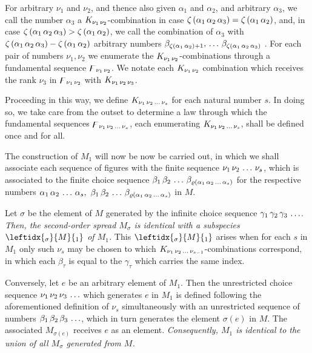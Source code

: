 \documentclass{amsart}
\newcommand\Rank[1]{\varrho\left(#1\right)}
\newcommand\Max[1]{\zeta\left(#1\right)}
\begin{document}
For arbitrary $\nu_1$ and $\nu_2$, and thence also given $\alpha_1$ and
$\alpha_2$, and arbitrary $\alpha_3$, we call the number $\alpha_3$ a
$K_{\Sequence{\nu_1,\nu_2}}$-combination in case $\Max{\Sequence{\alpha_1,\alpha_2,\alpha_3}} =
\Max{\Sequence{\alpha_1,\alpha_2}}$, and, in case $\Max{\Sequence{\alpha_1,\alpha_2,\alpha_3}} >
\Max{\Sequence{\alpha_1,\alpha_2}}$, we  call the combination of
$\alpha_3$ with $\Max{\Sequence{\alpha_1,\alpha_2,\alpha_3}} - \Max{\Sequence{\alpha_1,\alpha_2}}$
arbitrary numbers $\beta_{\Max{\Sequence{\alpha_1,\alpha_2}} +
1},\,\dots\,\beta_{\Max{\Sequence{\alpha_1,\alpha_2,\alpha_3}}}$ . For each pair of numbers $\nu_1,
\nu_2$ we enumerate the $K_{\Sequence{\nu_1,\nu_2}}$-combinations through a
fundamental sequence $\digamma_{\Sequence{\nu_1,\nu_2}}$. We notate each
$K_{\Sequence{\nu_1,\nu_2}}$ combination which receives the rank $\nu_3$ in
$\digamma_{\Sequence{\nu_1,\nu_2}}$ with $K_{\Sequence{\nu_1,\nu_2,\nu_3}}$.

Proceeding in this way, we define $K_{\Sequence{\nu_1,\nu_2,\dots,\nu_s}}$ for each natural
number $s$. In doing so, we take care from the outset to determine a
law through which the fundamental sequences $\digamma_{\Sequence{\nu_1,\nu_2,\dots,\nu_s}}$,
each enumerating $K_{\Sequence{\nu_1,\nu_2,\dots,\nu_s}}$, shall be defined once and for all.

The construction of $M_1$ will now be now be carried out, in which we shall
associate each sequence of figures with the finite sequence
$\Sequence{\nu_1,\nu_2,\dots,\nu_s}$, which is associated to the finite choice sequence
$\Sequence{\beta_1,\beta_2,\dots,\beta_{\Rank{\Sequence{\alpha_1,\alpha_2,\dots,\alpha_s}}}}$
for the respective numbers $\Sequence{\alpha_1,\alpha_2,\dots,\alpha_s},\
\Sequence{\beta_1,\beta_2,\dots,\beta_{\Rank{\Sequence{\alpha_1,\alpha_2,\dots,\alpha_s}}}}$
in $M$.

\bigskip

Let $\sigma$ be the element of $M$ generated by the infinite choice sequence
$\Sequence{\gamma_1,\gamma_2,\gamma_3,\dots}$. \emph{Then, the second-order
spread $M_\sigma$ is identical with a subspecies $\leftidx{_\sigma}{M}{_1}$ of
$M_1$.} This $\leftidx{_\sigma}{M}{_1}$ arises when for each $s$ in $M_1$ only
such $\nu_s$ may be chosen to which
$K_{\Sequence{\nu_1,\nu_2,\dots,\nu_{s-1}}}$-combinations correspond, in which
each $\beta_\tau$ is equal to the $\gamma_\tau$ which carries the same
index.

Conversely, let $e$ be an arbitrary element of $M_1$. Then the unrestricted
choice sequence $\Sequence{\nu_1,\nu_2,\nu_3,\dots}$ which generates $e$ in
$M_1$ is defined following the aforementioned definition of $\nu_s$
simultaneously with an unrestricted sequence of numbers
$\Sequence{\beta_1,\beta_2,\beta_3,\dots}$, which in turn generates the element
$\sigma(e)$ in $M$. The associated $M_{\sigma(e)}$ receives $e$ as an element.
\emph{Consequently, $M_1$ is identical to the union of all $M_\sigma$ generated
from $M$.}
\end{document}
